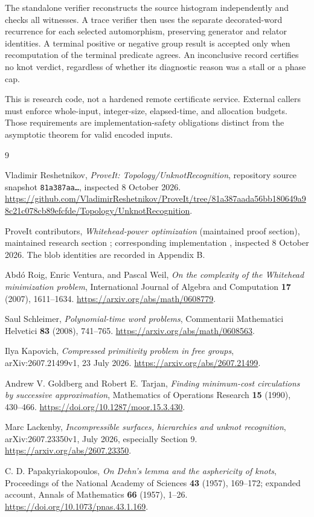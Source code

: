 \documentclass[11pt,letterpaper]{article}
\theoremstyle{definition}
\theoremstyle{remark}\newtheorem{remark}[theorem]{Remark}
\begin{document}
The standalone verifier reconstructs the source histogram independently and
checks all witnesses. A trace verifier then uses the separate decorated-word
recurrence for each selected automorphism, preserving generator and relator
identities. A terminal positive or negative group result is accepted only
when recomputation of the terminal predicate agrees. An inconclusive record
certifies no knot verdict, regardless of whether its diagnostic reason was
a stall or a phase cap.

This is research code, not a hardened remote certificate service. External
callers must enforce whole-input, integer-size, elapsed-time, and allocation
budgets. Those requirements are implementation-safety obligations distinct
from the asymptotic theorem for valid encoded inputs.

\begin{thebibliography}{9}

Vladimir Reshetnikov, \emph{ProveIt: Topology/UnknotRecognition}, repository
source snapshot \texttt{81a387aa\ldots}, inspected 8 October 2026.
\url{https://github.com/VladimirReshetnikov/ProveIt/tree/81a387aada56bb180649a98c21c078cb89efcfde/Topology/UnknotRecognition}.

ProveIt contributors, \emph{Whitehead-power optimization} (maintained proof section),
maintained research section ; corresponding
implementation , inspected 8 October 2026.
The blob identities are recorded in Appendix B.

Abd\'o Roig, Enric Ventura, and Pascal Weil,
\emph{On the complexity of the Whitehead minimization problem},
International Journal of Algebra and Computation \textbf{17} (2007),
1611--1634. \url{https://arxiv.org/abs/math/0608779}.

Saul Schleimer, \emph{Polynomial-time word problems},
Commentarii Mathematici Helvetici \textbf{83} (2008), 741--765.
\url{https://arxiv.org/abs/math/0608563}.

Ilya Kapovich, \emph{Compressed primitivity problem in free groups},
arXiv:2607.21499v1, 23 July 2026.
\url{https://arxiv.org/abs/2607.21499}.

Andrew V. Goldberg and Robert E. Tarjan,
\emph{Finding minimum-cost circulations by successive approximation},
Mathematics of Operations Research \textbf{15} (1990), 430--466.
\url{https://doi.org/10.1287/moor.15.3.430}.

Marc Lackenby, \emph{Incompressible surfaces, hierarchies and unknot recognition},
arXiv:2607.23350v1, July 2026, especially Section 9.
\url{https://arxiv.org/abs/2607.23350}.

C. D. Papakyriakopoulos, \emph{On Dehn's lemma and the asphericity of knots},
Proceedings of the National Academy of Sciences \textbf{43} (1957), 169--172;
expanded account, Annals of Mathematics \textbf{66} (1957), 1--26.
\url{https://doi.org/10.1073/pnas.43.1.169}.

\end{thebibliography}
\end{document}
